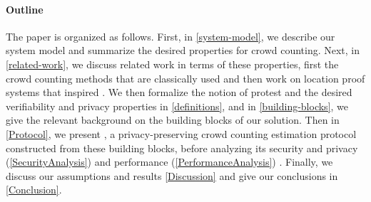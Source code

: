 \paragraph*{Outline}

The paper is organized as follows.
First, in \cref{system-model}, we describe our system model and summarize the desired properties for crowd counting. Next, in \cref{related-work}, we discuss related work in terms of these properties, first the crowd counting methods that are classically used and then work on location proof systems that inspired \CROCUS. 
We then formalize the notion of protest and the desired verifiability and privacy properties in \cref{definitions}, and in \cref{building-blocks}, we give the relevant background on the building blocks of our solution. 
Then in \cref{Protocol}, we present \CROCUS, a privacy-preserving crowd counting estimation protocol constructed from these building blocks, before analyzing its security and privacy (\cref{SecurityAnalysis}) and performance (\cref{PerformanceAnalysis}) .
Finally, we discuss our assumptions and results \cref{Discussion} and give our conclusions in \cref{Conclusion}.
